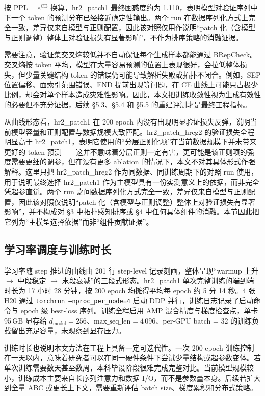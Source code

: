 按 $\text{PPL} = e^{\text{CE}}$ 换算，hr2\_patch1 最终困惑度约为 1.110，表明模型对验证序列中下一个 token 的预测分布已经接近确定性输出。两个 run 在数据序列化方式上完全一致，差异仅来自模型与正则配置，因此该对照仅用作说明“patch 化（含模型与正则调整）整体上对验证损失有显著影响”，不作为排序策略的消融证据。

需要注意，验证集交叉熵较低并不自动保证每个生成样本都能通过 BRepCheck。交叉熵按 token 平均，模型在大量容易预测的位置上表现很好，会拉低整体损失，但少量关键结构 token 的错误仍可能导致解析失败或拓扑不闭合。例如，SEP 位置偏移、面索引范围错误、END 提前出现等问题，在 CE 曲线上可能只占极少比例，却会对单个样本造成灾难性影响。因此，本文把训练收敛性视为生成有效性的必要但不充分证据，后续 §5.3、§5.4 和 §5.5 的重建评测才是最终工程指标。

从曲线形态看，hr2\_patch1 在 200 epoch 内没有出现明显验证损失反弹，说明当前模型容量和正则配置与数据规模大致匹配。hr2\_patch\_hreg2 的验证损失全程明显高于 hr2\_patch1，表明它使用的“分层正则化项”在当前数据规模下并未带来更好的 token 预测——这并不意味着分层正则一定有害，更可能是该正则项的强度需要更细的调参，但在没有更多 ablation 的情况下，本文不对其具体形式作强解释。这里只把 hr2\_patch\_hreg2 作为同数据、同训练周期下的对照 run 使用，用于说明最终选择 hr2\_patch1 作为主模型具有一份实测意义上的依据，而非完全凭超参直觉。两个 run 之间数据序列化方式完全一致，差异仅来自模型与正则配置，因此该对照仅说明“patch 化（含模型与正则调整）整体上对验证损失有显著影响”，并不构成对 §3 中拓扑感知排序或 §4 中任何具体组件的消融。本节因此把它列为“主模型选择依据”而非“组件贡献证据”。

\subsection{学习率调度与训练时长}

学习率随 step 推进的曲线由 201 行 step-level 记录刻画，整体呈现“warmup 上升 $\to$ 中段稳定 $\to$ 末段衰减”的三段式形态。hr2\_patch1 单次完整训练的端到端时长为 17 小时 28 分钟，按 200 epoch 均摊得平均每 epoch 约 5 分 14 秒。4 张 H20 通过 \texttt{torchrun --nproc\_per\_node=4} 启动 DDP 并行，训练日志记录了启动命令与 epoch 级 best-loss 序列。训练全程启用 AMP 混合精度与梯度检查点，单卡 95\,GB 显存给 $d_{\text{model}} = 256$、$\text{max\_seq\_len} = 4\,096$、per-GPU batch = 32 的训练负载留出充足容量，未观察到显存压力。

训练时长也说明本文方法在工程上具备一定可迭代性。一次 200 epoch 训练控制在一天以内，意味着研究者可以在同一硬件条件下尝试少量结构或超参数变体。若单次训练需要数天甚至数周，本科毕设阶段很难完成完整对比。当前模型规模较小，训练成本主要来自长序列注意力和数据 I/O，而不是参数量本身。后续若扩大到全量 ABC 或更长上下文，需要重新评估 batch size、梯度累积和分布式策略。

